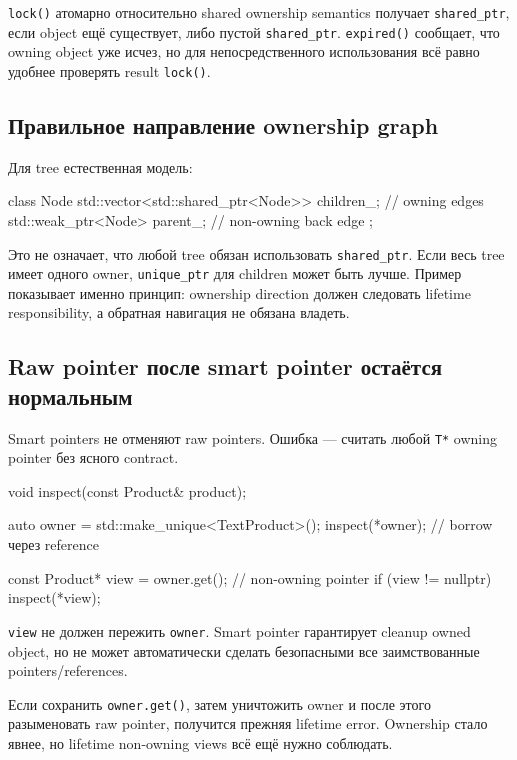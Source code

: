 \texttt{lock()} атомарно относительно shared ownership semantics получает
\texttt{shared\_ptr}, если object ещё существует, либо пустой
\texttt{shared\_ptr}. \texttt{expired()} сообщает, что owning object уже исчез,
но для непосредственного использования всё равно удобнее проверять result
\texttt{lock()}.

\subsection{Правильное направление ownership graph}

Для tree естественная модель:

\begin{cppcode}
class Node {
    std::vector<std::shared_ptr<Node>> children_; // owning edges
    std::weak_ptr<Node> parent_;                  // non-owning back edge
};
\end{cppcode}

Это не означает, что любой tree обязан использовать \texttt{shared\_ptr}.
Если весь tree имеет одного owner, \texttt{unique\_ptr} для children может быть
лучше. Пример показывает именно принцип: ownership direction должен следовать
lifetime responsibility, а обратная навигация не обязана владеть.

\subsection{Raw pointer после smart pointer остаётся нормальным}

Smart pointers не отменяют raw pointers. Ошибка --- считать любой
\texttt{T*} owning pointer без ясного contract.

\begin{cppcode}
void inspect(const Product& product);

auto owner = std::make_unique<TextProduct>();
inspect(*owner);              // borrow через reference

const Product* view = owner.get(); // non-owning pointer
if (view != nullptr) {
    inspect(*view);
}
\end{cppcode}

\texttt{view} не должен пережить \texttt{owner}. Smart pointer гарантирует
cleanup owned object, но не может автоматически сделать безопасными все
заимствованные pointers/references.

\begin{warningbox}
Если сохранить \texttt{owner.get()}, затем уничтожить owner и после этого
разыменовать raw pointer, получится прежняя lifetime error. Ownership стало
явнее, но lifetime non-owning views всё ещё нужно соблюдать.
\end{warningbox}

